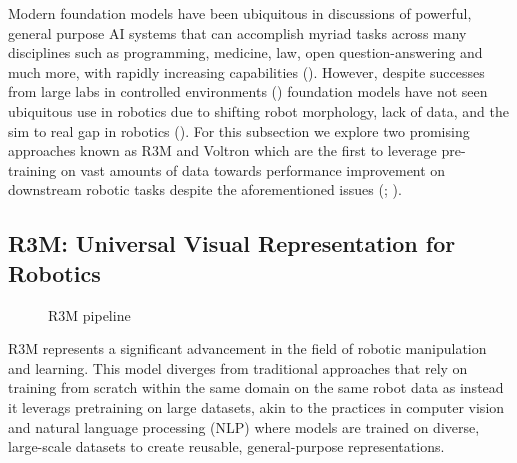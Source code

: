 \documentclass[
  letterpaper,
  numbers=noenddot,
  DIV=11,
  oneside]{scrreprt}
\theoremstyle{remark}
\begin{document}
Modern foundation models have been ubiquitous in discussions of
powerful, general purpose AI systems that can accomplish myriad tasks
across many disciplines such as programming, medicine, law, open
question-answering and much more, with rapidly increasing capabilities
().
However, despite successes from large labs in controlled environments
() foundation models
have not seen ubiquitous use in robotics due to shifting robot
morphology, lack of data, and the sim to real gap in robotics
(). For this
subsection we explore two promising approaches known as R3M and Voltron
which are the first to leverage pre-training on vast amounts of data
towards performance improvement on downstream robotic tasks despite the
aforementioned issues (;
).

\subsection{R3M: Universal Visual Representation for
Robotics}\label{r3m-universal-visual-representation-for-robotics}

\begin{figure}


\caption{\label{fig-r3m-pipline}R3M pipeline}

\end{figure}%

R3M represents a significant advancement in the field of robotic
manipulation and learning. This model diverges from traditional
approaches that rely on training from scratch within the same domain on
the same robot data as instead it leverags pretraining on large
datasets, akin to the practices in computer vision and natural language
processing (NLP) where models are trained on diverse, large-scale
datasets to create reusable, general-purpose representations.
\end{document}
